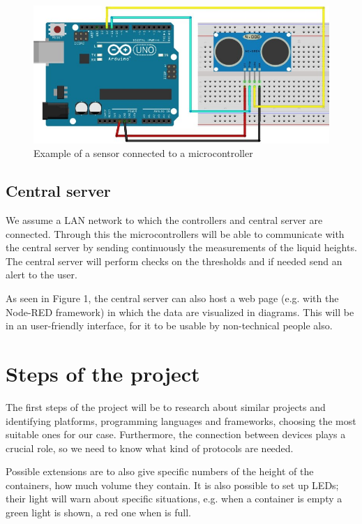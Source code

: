 \documentclass{article}
\begin{document}
\begin{figure}[h]
\includegraphics[scale=0.5]{sensorAndArduino.jpg}
\caption{Example of a sensor connected to a microcontroller}
\label{sensorWithArduino}
\end{figure}

\subsection{Central server}

We assume a LAN network to which the controllers and central
server are connected. Through this the microcontrollers will be able to communicate with the
central server by sending continuously the measurements of the liquid heights. 
The central server will perform checks on the thresholds and if needed send an alert to the user. 

As seen in Figure 1, the central server can also host a web page (e.g. with the Node-RED framework) in which the data are visualized in diagrams. 
This will be in an user-friendly interface, for it to be usable by non-technical people also.

\section{Steps of the project}

The first steps of the project will be to research about similar projects and
identifying platforms, programming languages and frameworks, choosing
the most suitable ones for our case.
Furthermore, the connection between devices
plays a crucial role, so we need to know what kind of protocols are needed.

Possible extensions are to also give specific numbers of the height of the
containers, how much volume they contain.
It is also possible to set up LEDs; their light will warn about specific
situations, e.g. when a container is empty a green light is shown, a red one when
is full.
\end{document}
